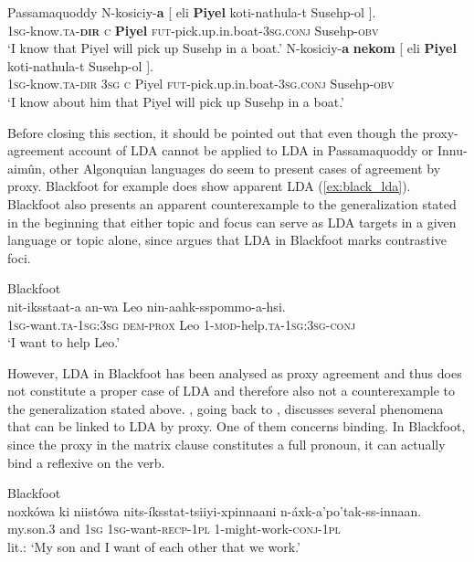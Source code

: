 \documentclass[output=paper
,modfonts
,nonflat]{langsci/langscibook}
\begin{document}
\begin{exe}
\ex Passamaquoddy \citep[][270]{Bruening2001a} \label{ex:passam_pro}
	\xlist
	\ex 
		\gll N-kosiciy-\textbf{a} [ eli \textbf{Piyel} koti-nathula-t Susehp-ol ].\\
			 \textsc{1sg}-know.\textsc{ta}-\textbf{\textsc{dir}} {} \textsc{c} \textbf{Piyel} \textsc{fut}-pick.up.in.boat-\textsc{3sg.conj} Susehp-\textsc{obv}\\
		\glt `I know that Piyel will pick up Susehp in a boat.'
	\ex
	 	\gll *N-kosiciy-\textbf{a} \textbf{nekom} [ eli \textbf{Piyel} koti-nathula-t Susehp-ol ].\\
			 \textsc{1sg}-know.\textsc{ta}-\textsc{dir} \textsc{3sg} {} \textsc{c} Piyel \textsc{fut}-pick.up.in.boat-3\textsc{sg.conj} Susehp-\textsc{obv}\\
		\glt `I know about him that Piyel will pick up Susehp in a boat.'
	\endxlist
\end{exe}
Before closing this section, it should be pointed out that even though the proxy-agreement account of LDA cannot be applied to LDA in Passamaquoddy or Innu-aim\^{u}n, other Algonquian languages do seem to present cases of agreement by proxy. Blackfoot for example does show apparent LDA (\ref{ex:black_lda}). Blackfoot also presents an apparent counterexample to the generalization stated in the beginning that either topic and focus can serve as LDA targets in a given language or topic alone, since \citet{Bliss2009} argues that LDA in Blackfoot marks contrastive foci.
\begin{exe}
\ex Blackfoot \citep[][1]{Bliss2009}\label{ex:black_lda}\\
	\gll nit-iksstaat-a an-wa Leo nin-aahk-sspommo-a-hsi.\\
		 \textsc{1sg}-want.\textsc{ta}-\textsc{1sg:3sg} \textsc{dem-prox} Leo 1-\textsc{mod}-help.\textsc{ta-1sg:3sg-conj}\\
	\glt `I want to help Leo.'
\end{exe}
However, LDA in Blackfoot has been analysed as proxy agreement and thus does not constitute a proper case of LDA and therefore also not a counterexample to the generalization stated above. \citet{Polinsky2003}, going back to \citet{Frantz1978}, discusses several phenomena that can be linked to LDA by proxy. One of them concerns binding. In Blackfoot, since the proxy in the matrix clause constitutes a full pronoun, it can actually bind a reflexive on the verb.
\begin{exe}
\ex Blackfoot \citep[][99, via Polinsky 2003: 286]{Frantz1978}\\
	\gll noxk\'{o}wa ki niist\'{o}wa nits-\'{i}ksstat-tsiiyi-xpinnaani n-\'{a}xk-a'po'tak-ss-innaan.\\
		 my.son.3 and \textsc{1sg} \textsc{1sg}-want-\textsc{recp}-1\textsc{pl} 1-might-work-\textsc{conj-1pl}\\
	\glt lit.: `My son and I want of each other that we work.'
\end{exe}
\end{document}
